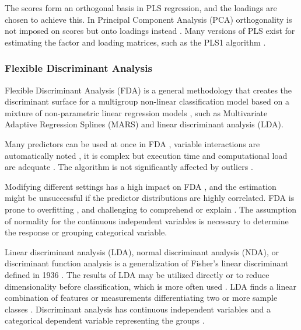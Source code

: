 \documentclass[sn-mathphys-num]{sn-jnl}%
\begin{document}
The scores form an orthogonal basis in PLS regression, and the loadings are chosen to achieve this. In Principal Component Analysis (PCA) orthogonality is not imposed on scores but onto loadings instead \cite{lindgren1993kernel, de1994comments, dayal1997improved, de1993simpls, rannar1994pls, abdi2010partial}. Many versions of PLS exist for estimating the factor and loading matrices, such as the PLS1 algorithm \cite{takane2016pls, hoskuldsson1988pls}. 

\subsubsection{Flexible Discriminant Analysis}

Flexible Discriminant Analysis (FDA) is a general methodology that creates the discriminant surface for a multigroup non-linear classification model based on a mixture of non-parametric linear regression models \cite{hastie1995penalized}, such as Multivariate Adaptive Regression Splines (MARS) and linear discriminant analysis (LDA).

Many predictors can be used at once in FDA \cite{hastie2009elements}, variable interactions are automatically noted \cite{hastie1994flexible}, it is complex but execution time and computational load are adequate \cite{reynes2006choice}. The algorithm is not significantly affected by outliers \cite{phillips2017applying}.

Modifying different settings has a high impact on FDA \cite{hallgren2019species}, and the estimation might be unsuccessful if the predictor distributions are highly correlated. FDA is prone to overfitting \cite{thuiller2016ensemble}, and challenging to comprehend or explain \cite{quillfeldt2017influence}. The assumption of normality for the continuous independent variables is necessary \cite{zhang2019using} to determine the response or grouping categorical variable. 

Linear discriminant analysis (LDA), normal discriminant analysis (NDA), or discriminant function analysis is a generalization of Fisher's linear discriminant defined in 1936 \cite{cohen2013applied}. The results of LDA may be utilized directly or to reduce dimensionality before classification, which is more often used \cite{hansen2005using}. LDA finds a linear combination of features or measurements differentiating two or more sample classes \cite{fisher1936use, mclachlan2005discriminant}. Discriminant analysis has continuous independent variables and a categorical dependent variable representing the groups \cite{wetcher2011analyzing}.
\end{document}
